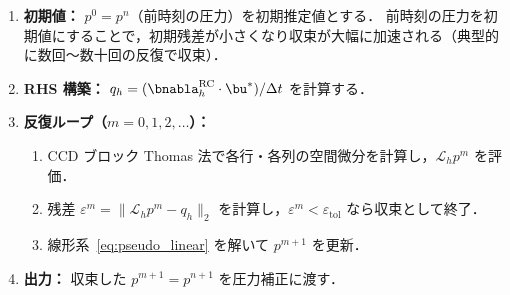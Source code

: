 \begin{tcolorbox}[mybox, title={PPE 仮想時間陰解法の反復アルゴリズム}]
\begin{enumerate}
  \item \textbf{初期値：} $p^0 = p^n$（前時刻の圧力）を初期推定値とする．
        前時刻の圧力を初期値にすることで，初期残差が小さくなり収束が大幅に加速される（典型的に数回〜数十回の反復で収束）．
  \item \textbf{RHS 構築：} $q_h = (\bnabla_h^{\mathrm{RC}}\cdot\bu^*)/\Delta t$ を計算する．
  \item \textbf{反復ループ（$m = 0, 1, 2, \dots$）：}
    \begin{enumerate}
      \item CCD ブロック Thomas 法で各行・各列の空間微分を計算し，$\mathcal{L}_h p^m$ を評価．
      \item 残差 $\varepsilon^m = \|\mathcal{L}_h p^m - q_h\|_2$ を計算し，$\varepsilon^m < \varepsilon_{\mathrm{tol}}$ なら収束として終了．
      \item 線形系~\eqref{eq:pseudo_linear} を解いて $p^{m+1}$ を更新．
    \end{enumerate}
  \item \textbf{出力：} 収束した $p^{m+1} = p^{n+1}$ を圧力補正に渡す．
\end{enumerate}
\end{tcolorbox}

